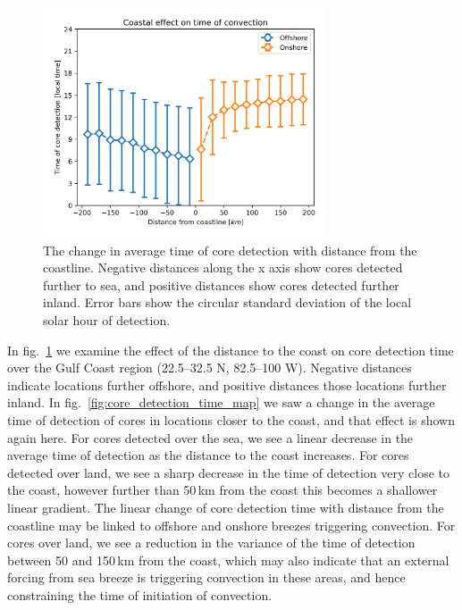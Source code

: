 \begin{figure}[tp]
    \centering
    \includegraphics[width=0.75\textwidth]{figures/chapter2_14.png}
    \caption[
    The change in average time of core detection with distance from the coastline
    ]{
    The change in average time of core detection with distance from the coastline. Negative distances along the x axis show cores detected further to sea, and positive distances show cores detected further inland. Error bars show the circular standard deviation of the local solar hour of detection.
    }
    \label{fig:core_coast_effect}
\end{figure}

In fig.~\ref{fig:core_coast_effect} we examine the effect of the distance to the coast on core detection time over the Gulf Coast region (22.5--32.5\,\textdegree\,N, 82.5--100\,\textdegree\,W).
Negative distances indicate locations further offshore, and positive distances those locations further inland.
In fig.~\ref{fig:core_detection_time_map} we saw a change in the average time of detection of cores in locations closer to the coast, and that effect is shown again here.
For cores detected over the sea, we see a linear decrease in the average time of detection as the distance to the coast increases.
For cores detected over land, we see a sharp decrease in the time of detection very close to the coast, however further than 50\,\unit{km} from the coast this becomes a shallower linear gradient.
The linear change of core detection time with distance from the coastline may be linked to offshore and onshore breezes triggering convection.
For cores over land, we see a reduction in the variance of the time of detection between 50 and 150\,\unit{km} from the coast, which may also indicate that an external forcing from sea breeze is triggering convection in these areas, and hence constraining the time of initiation of convection.

